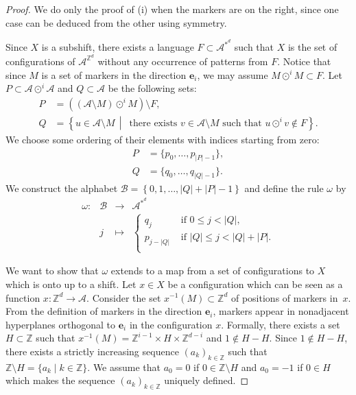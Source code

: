 \documentclass[10pt,a4paper]{amsart}
\newcommand{\Acal}{\mathcal{A}} %
\newcommand{\Bcal}{\mathcal{B}}
\newcommand{\Z}{\mathbb{Z}}
\newcommand{\be}{{\boldsymbol{e}}}
\begin{document}
\begin{proof}
    We do only the proof of (i) when the markers are on the right, since
    one case can be deduced from the other using symmetry.

    Since $X$ is a subshift, there exists a language $F\subset\Acal^{*^d}$
    such that $X$ is the set of configurations of $\Acal^{\Z^d}$ without any
    occurrence of patterns from $F$. Notice that since $M$ is a set of markers
    in the direction $\be_i$, we may assume $M\odot^i M\subset F$.
    Let $P\subset\Acal\odot^i\Acal$ and $Q\subset\Acal$ be the following sets:
    \begin{align*}
        P &= \left((\Acal\setminus M) \odot^i M\right) \setminus F,\\
        Q &= \left\{u\in\Acal\setminus M\,\middle|\, \text{ there exists }
        v\in\Acal\setminus
            M \text{ such that } u\odot^iv \notin F\right\}.
    \end{align*}
    We choose some ordering of their elements with indices starting from zero:
    \begin{align*}
		P&=\{p_0,\dots, p_{|P|-1}\},\\
		Q&=\{q_0,\dots, q_{|Q|-1}\}.
    \end{align*}
    We construct the alphabet $\Bcal=\left\{0,1,\dots,|Q|+|P|-1\right\}$
    and define the rule $\omega$ by
    \begin{equation}\label{eq:omegaStoT}
    \begin{array}{rccl}
    \omega:&\Bcal & \to & \Acal^{*^d}\\
        &j& \mapsto&
    \begin{cases}
        q_j         & \text{ if } 0\leq j <  |Q|,\\
        p_{j-|Q|} & \text{ if }|Q|\leq j < |Q|+|P|.\\
    \end{cases}
    \end{array}
    \end{equation}

    We want to show that $\omega$ extends to a map from a set of configurations to $X$ which
    is onto up to a shift.
    Let $x\in X$ be a configuration which can be seen as a function
    $x:\Z^d\to\Acal$.
    Consider the set $x^{-1}(M)\subset\Z^d$ of positions of markers
    in~$x$. From the definition of markers in the direction $\be_i$, 
    markers appear in nonadjacent hyperplanes orthogonal to $\be_i$ in the configuration $x$.
    Formally, there exists
    a set $H\subset\Z$ such that $x^{-1}(M)=\Z^{i-1}\times H\times\Z^{d-i}$ and
    $1\notin H-H$.
    Since $1\notin H-H$, there exists a strictly increasing sequence
    $(a_k)_{k\in\Z}$ such that $\Z\setminus H=\{a_k\mid k\in\Z\}$.
    We assume that $a_0=0$ if $0\in\Z\setminus H$ and $a_0=-1$ if $0\in H$
    which makes the sequence $(a_k)_{k\in\Z}$ uniquely defined.


\end{proof}
\end{document}
